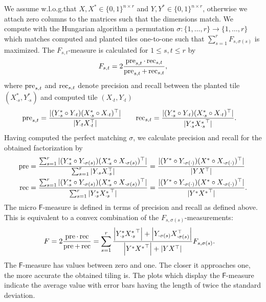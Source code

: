 We assume w.l.o.g.\@ that $X,X^*\in\{0,1\}^{n\times r}$ and $Y,Y^*\in\{0,1\}^{n\times r}$, otherwise we attach zero columns to the matrices such that the dimensions match. 
We compute with the Hungarian algorithm a permutation $\sigma:\{1,\ldots, r\}\rightarrow \{1,\ldots,r\}$ which matches computed and planted tiles one-to-one such that $\sum_{s=1}^rF_{s,\sigma(s)}$ is maximized. The $F_{s,t}$-measure is calculated for $1\leq s,t\leq r$ by  
\[
	F_{s,t}=2\frac{\operatorname{pre}_{s,t}\cdot\operatorname{rec}_{s,t}}{\operatorname{pre}_{s,t}+\operatorname{rec}_{s,t}},
\]
where $\operatorname{pre}_{s,t}$ and $\operatorname{rec}_{s,t}$ denote precision and recall between the planted tile $(X^*_{\cdot s},Y^*_{\cdot s})$ and computed tile $(X_{\cdot t},Y_{\cdot t})$
\begin{align*}
	\operatorname{pre}_{s,t} &= \frac{|(Y^*_{\cdot s}\circ Y_{\cdot t})(X^*_{\cdot s}\circ X_{\cdot t})^\top |}{|Y_{\cdot t}X_{\cdot t}^\top |} &\quad 
    \operatorname{rec}_{s,t} &= \frac{|(Y^*_{\cdot s}\circ Y_{\cdot t})(X^*_{\cdot s}\circ X_{\cdot t})^\top |}{|Y^*_{\cdot s}{X^*_{\cdot s}}^\top |}.  
\end{align*}
Having computed the perfect matching $\sigma$, we calculate precision and recall for the obtained factorization by
\begin{align*}
\operatorname{pre} &= \frac{\sum_{s=1}^r|(Y^*_{\cdot s}\circ Y_{\cdot \sigma(s)})(X^*_{\cdot s}\circ X_{\cdot \sigma(s)})^\top |}{\sum_{s=1}^r|Y_{\cdot s}X_{\cdot s}^\top |} 
= \frac{|(Y^*\circ Y_{\cdot \sigma(\cdot)})(X^*\circ X_{\cdot \sigma(\cdot)})^\top |}{|YX^\top |}\\ 
\operatorname{rec} &= \frac{\sum_{s=1}^r|(Y^*_{\cdot s}\circ Y_{\cdot \sigma(s)})(X^*_{\cdot s}\circ X_{\cdot \sigma(s)})^\top |}{\sum_{s=1}^r|Y_{\cdot s}^* {X_{\cdot s}^*}^\top |} 
    = \frac{|(Y^*\circ Y_{\cdot\sigma(\cdot)})(X^*\circ X_{\cdot \sigma(\cdot)})^\top |}{|Y^*{X^*}^\top |}.
\end{align*}
The micro $\mathsf{F}$-measure is defined in terms of precision and recall as defined above. This is equivalent to a convex combination of the $F_{s,\sigma(s)}$-measurements:  
\begin{align*}
	F&=2\frac{\operatorname{pre}\cdot\operatorname{rec}}{\operatorname{pre}+\operatorname{rec}}
    = \sum_{s=1}^r\frac{\left|Y^*_{\cdot s}{X^*_{\cdot s}}^\top \right| + \left|Y_{\cdot\sigma(s)}X_{\cdot\sigma(s)}^\top \right|}{\left|Y^* {X^*}^\top \right|+\left|Y X^\top \right|}F_{s,\sigma(s)}.
\end{align*}
The $\mathsf{F}$-measure has values between zero and one. The closer it approaches one, the more accurate the obtained tiling is. The plots which display the $\mathsf{F}$-measure indicate the average value with error bars having the length of twice the standard deviation.

